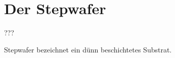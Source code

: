 
\section{Der Stepwafer}
\label{sec:stepwafer}

??? %

Stepwafer bezeichnet ein dünn beschichtetes Substrat.